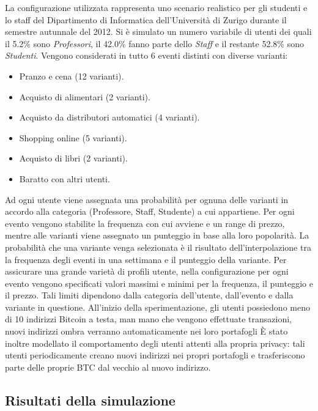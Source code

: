 La configurazione utilizzata rappresenta uno scenario realistico per gli studenti e lo staff del Dipartimento di Informatica dell'Università di Zurigo durante il semestre autunnale del 2012.
Si è simulato un numero variabile di utenti dei quali il 5.2\% sono \emph{Professori}, il 42.0\% fanno parte dello \emph{Staff} e il restante 52.8\% sono \emph{Studenti}. Vengono considerati in tutto 6 eventi distinti con diverse varianti:
\begin{itemize}
    \item Pranzo e cena (12 varianti).
    \item Acquisto di alimentari (2 varianti).
    \item Acquisto da distributori automatici (4 varianti).
    \item Shopping online (5 varianti).
    \item Acquisto di libri (2 varianti).
    \item Baratto con altri utenti.
\end{itemize}
Ad ogni utente viene assegnata una probabilità per ognuna delle varianti in accordo alla categoria (Professore, Staff, Studente) a cui appartiene.
Per ogni evento vengono stabilite la frequenza con cui avviene e un range di prezzo, mentre alle varianti viene assegnato un punteggio in base alla loro popolarità. La probabilità che una variante venga selezionata è il risultato dell'interpolazione tra la frequenza degli eventi in una settimana e il punteggio della variante.
Per assicurare una grande varietà di profili utente, nella configurazione per ogni evento vengono specificati valori massimi e minimi per la frequenza, il punteggio e il prezzo. Tali limiti dipendono dalla categoria dell'utente, dall'evento e dalla variante in questione.
All'inizio della sperimentazione, gli utenti possiedono meno di 10 indirizzi Bitcoin a testa, man mano che vengono effettuate transazioni, nuovi indirizzi ombra verranno automaticamente  nei loro portafogli È stato inoltre modellato il comportamento degli utenti attenti alla propria privacy: tali utenti periodicamente creano nuovi indirizzi nei propri portafogli e trasferiscono parte delle proprie BTC dal vecchio al nuovo indirizzo.

\subsection{Risultati della simulazione}\label{risultati-simulazione}


